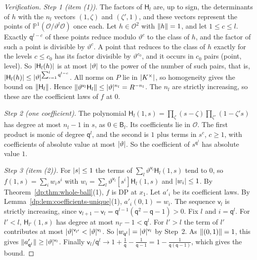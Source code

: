\begin{proof}[Verification]
\emph{Step 1 (item (1)).} The factors of $\mathsf H_l$ are, up to sign, the determinants of $h$ with the $n_l$ vectors $(1,\zeta)$ and $(\zeta',1)$, and these vectors represent the points of $\mathbb P^1(\mathcal O/\vartheta^l\mathcal O)$ once each. Let $h\in\mathcal O^2$ with $\lVert h\rVert=1$, and let $1\le c\le l$. Exactly $\mathsf q^{l-c}$ of these points reduce modulo $\vartheta^c$ to the class of $h$, and the factor of such a point is divisible by $\vartheta^c$. A point that reduces to the class of $h$ exactly for the levels $c\le c_0$ has its factor divisible by $\vartheta^{c_0}$, and it occurs in $c_0$ pairs (point, level). So $\lvert \mathsf H_l(h)\rvert$ is at most $\lvert \vartheta\rvert$ to the power of the number of such pairs, that is, $\lvert \mathsf H_l(h)\rvert\le\lvert \vartheta\rvert^{\sum_{c=1}^l\mathsf q^{l-c}}$. All norms on $P$ lie in $\lvert K^\times\rvert$, so homogeneity gives the bound on $\lVert \mathsf H_l\rVert$. Hence $\lVert \vartheta^{\mathsf v_l}\mathsf H_l\rVert\le\lvert \vartheta\rvert^{n_l}=R^{-n_l}$. The $n_l$ are strictly increasing, so these are the coefficient laws of $f$ at $0$.

\emph{Step 2 (one coefficient).} The polynomial $\mathsf H_l(1,s)=\prod_\zeta(s-\zeta)\prod_{\zeta'}(1-\zeta's)$ has degree at most $n_l-1$ in $s$, as $0\in\mathsf B_l$. Its coefficients lie in $\mathcal O$. The first product is monic of degree $\mathsf q^l$, and the second is $1$ plus terms in $s^c$, $c\ge1$, with coefficients of absolute value at most $\lvert \vartheta\rvert$. So the coefficient of $s^{\mathsf q^l}$ has absolute value $1$.

\emph{Step 3 (item (2)).} For $\lvert s\rvert\le1$ the terms of $\sum_l\vartheta^{\mathsf v_l}\mathsf H_l(1,s)$ tend to $0$, so $f(1,s)=\sum_iw_is^i$ with $w_i=\sum_l\vartheta^{\mathsf v_l}[s^i]\mathsf H_l(1,s)$ and $\lvert w_i\rvert\le1$. By Theorem~\ref{dp:thm:whole-ball}(1), $f$ is DP at $x_1$. Let $a'_i$ be its coefficient laws. By Lemma~\ref{dp:lem:coefficients-unique}(1), $a'_i(0,1)=w_i$. The sequence $\mathsf v_l$ is strictly increasing, since $\mathsf v_{l+1}-\mathsf v_l=\mathsf q^{l-1}(\mathsf q^2-\mathsf q-1)>0$. Fix $l$ and $i=\mathsf q^l$. For $l'<l$, $\mathsf H_{l'}(1,s)$ has degree at most $n_{l'}-1<\mathsf q^l$. For $l'>l$ the term of $l'$ contributes at most $\lvert \vartheta\rvert^{\mathsf v_{l'}}<\lvert \vartheta\rvert^{\mathsf v_l}$. So $\lvert w_{\mathsf q^l}\rvert=\lvert \vartheta\rvert^{\mathsf v_l}$ by Step~2. As $\lVert (0,1)\rVert=1$, this gives $\lVert a'_{\mathsf q^l}\rVert\ge\lvert \vartheta\rvert^{\mathsf v_l}$. Finally $\mathsf v_l/\mathsf q^l\to1+\frac1{\mathsf q}-\frac1{\mathsf q-1}=1-\frac1{\mathsf q(\mathsf q-1)}$, which gives the bound.
\end{proof}
